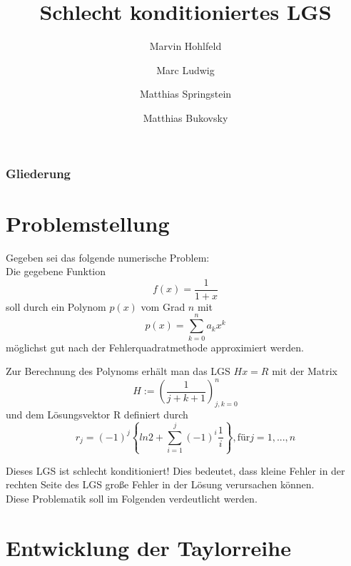 \documentclass{beamer}
\title{Schlecht konditioniertes LGS}
\author[M. Hohlfeld\and M. Ludwig\and M. Springstein \and M. Bukovsky]
  {Marvin Hohlfeld\and Marc Ludwig\and Matthias Springstein\and Matthias Bukovsky}
\begin{document}
  \begin{frame}
    \titlepage
  \end{frame}

  \begin{frame}
    \frametitle{Gliederung}\tableofcontents
  \end{frame}

  \section{Problemstellung}
  \begin{frame}
    Gegeben sei das folgende numerische Problem: \\[1em]
    
    Die gegebene Funktion 
    \begin{equation}
      f(x) = \frac{1}{1+x}
    \end{equation}  
    soll durch ein Polynom $p(x)$ vom Grad $n$ mit
    \begin{equation}
      p(x) = \sum_{k=0}^n a_k x^k
    \end{equation}
    möglichst gut nach der Fehlerquadratmethode approximiert werden.
  \end{frame}
  \begin{frame}
    Zur Berechnung des Polynoms erhält man das LGS $Hx=R$ mit der Matrix \\
    \begin{equation}
    H := \left(\frac{1}{j+k+1}\right)_{j,k=0}^n
    \end{equation}
    und dem Lösungsvektor R definiert durch \\
    \begin{equation}
    r_j = (-1)^j \left\{ ln2 + \sum_{i=1}^j (-1)^i \frac{1}{i} \right\}, \text{für} j = 1,...,n
    \end{equation}

    Dieses LGS ist schlecht konditioniert! Dies bedeutet, dass kleine Fehler in der rechten Seite des LGS große Fehler in der Lösung verursachen können.
    \\[1em]
    Diese Problematik soll im Folgenden verdeutlicht werden.
  \end{frame}
  
  \section{Entwicklung der Taylorreihe}
\end{document}
